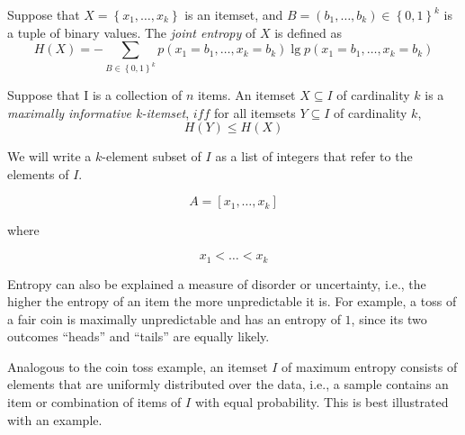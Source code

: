 \begin{definition}
    Suppose that $X = \left\{ x_{1}, \dots, x_{k} \right\}$ is an itemset, and $B = \left( b_{1}, \dots, b_{k} \right) \in \left\{ 0, 1 \right\}^{k}$ is a tuple of binary values. The \emph{joint entropy} of $X$ is defined as
    \begin{equation*}
        H(X) = -\sum_{B \in \left\{ 0, 1 \right\}^{k}} p \left( x_{1} = b_{1}, \dots, x_{k} = b_{k} \right) \lg p \left( x_{1} = b_{1}, \dots, x_{k} = b_{k} \right)
    \end{equation*}
    \label{def:joint_entropy}
\end{definition}

\begin{definition}
    Suppose that I is a collection of $n$ items. An itemset $X \subseteq I$ of cardinality $k$ is a \emph{maximally informative k-itemset}, $iff$ for all itemsets $Y \subseteq I$ of cardinality $k$,
    \begin{equation}
        H(Y) \leq H(X)
    \end{equation}
    \label{def:miki}
\end{definition}

We will write a $k$-element subset of $I$ as a list of integers that refer to the elements of $I$.

\begin{equation*}
    A = \left[ x_{1}, \dots, x_{k} \right]
\end{equation*}

\noindent where

\begin{equation*}
    x_{1} < \dots < x_{k}
\end{equation*}

Entropy can also be explained a measure of disorder or uncertainty, i.e., the higher the entropy of an item the more unpredictable it is.
For example, a toss of a fair coin is maximally unpredictable and has an entropy of $1$, since its two outcomes ``heads'' and ``tails'' are equally likely.

Analogous to the coin toss example, an itemset $I$ of maximum entropy consists of elements that are uniformly distributed over the data, i.e., a sample contains an item or combination of items of $I$ with equal probability.
This is best illustrated with an example.

